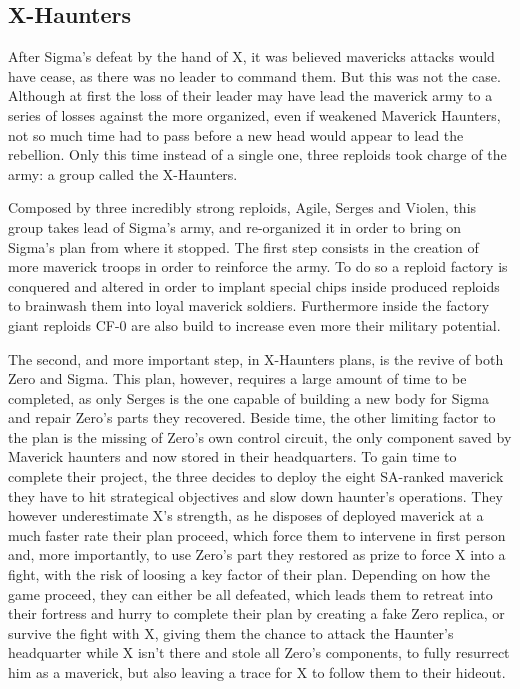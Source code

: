 \subsection{X-Haunters}
After Sigma's defeat by the hand of X, it was believed mavericks attacks would have cease, as there was no leader to command them. But this was not the case. Although at first the loss of their leader may have lead the maverick army to a series of losses against the more organized, even if weakened Maverick Haunters, not so much time had to pass before a new head would appear to lead the rebellion. Only this time instead of a single one, three reploids took charge of the army: a group called the X-Haunters.

Composed by three incredibly strong reploids, Agile, Serges and Violen, this group takes lead of Sigma's army, and re-organized it in order to bring on Sigma's plan from where it stopped. The first step consists in the creation of more maverick troops in order to reinforce the army. To do so a reploid factory is conquered and altered in order to implant special chips inside produced reploids to brainwash them into loyal maverick soldiers. Furthermore inside the factory giant reploids CF-0 are also build to increase even more their military potential.

The second, and more important step, in X-Haunters plans, is the revive of both Zero and Sigma. This plan, however, requires a large amount of time to be completed, as only Serges is the one capable of building a new body for Sigma and repair Zero's parts they recovered. Beside time, the other limiting factor to the plan is the missing of Zero's own control circuit, the only component saved by Maverick haunters and now stored in their headquarters. To gain time to complete their project, the three decides to deploy the eight SA-ranked maverick they have to hit strategical objectives and slow down haunter's operations. They however underestimate X's strength, as he disposes of deployed maverick at a much faster rate their plan proceed, which force them to intervene in first person and, more importantly, to use Zero's part they restored  as prize to force X into a fight, with the risk of loosing a key factor of their plan. Depending on how the game proceed, they can either be all defeated, which leads them to retreat into their fortress and hurry to complete their plan by creating a fake Zero replica, or survive the fight with X, giving them the chance to attack the Haunter's headquarter while X isn't there and stole all Zero's components, to fully resurrect him as a maverick, but also leaving a trace for X to follow them to their hideout.

